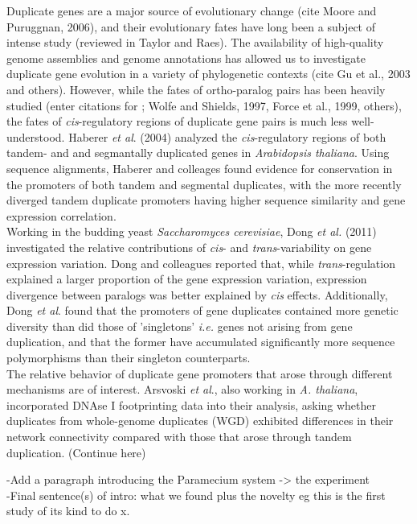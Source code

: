 \documentclass[nogrid]{MBE}%
\begin{document}
Duplicate genes are a major source of evolutionary change (cite \citep{Ohno:1970wm} Moore and Puruggnan, 2006), and their evolutionary fates have long been a subject of intense study (reviewed in Taylor and Raes). The availability of high-quality genome assemblies and genome annotations has allowed us to investigate duplicate gene evolution in a variety of phylogenetic contexts (cite Gu et al., 2003 and others). However, while the fates of ortho-paralog pairs has been heavily studied (enter citations for \citep{Ohno:1970wm}; Wolfe and Shields, 1997, Force et al., 1999, others), the fates of \textit{cis}-regulatory regions of duplicate gene pairs is much less well-understood. Haberer \textit{et al}. (2004) analyzed the \textit{cis}-regulatory regions of both tandem- and and segmantally duplicated genes in \textit{Arabidopsis thaliana}. Using sequence alignments, Haberer and colleages found evidence for conservation in the promoters of both tandem and segmental duplicates, with the more recently diverged tandem duplicate promoters having higher sequence similarity and gene expression correlation.\\

Working in the budding yeast \textit{Saccharomyces cerevisiae}, Dong \textit{et al.} (2011) investigated the relative contributions of \textit{cis}- and \textit{trans}-variability on gene expression variation. Dong and colleagues reported that, while \textit{trans}-regulation explained a larger proportion of the gene expression variation, expression divergence between paralogs was better explained by \textit{cis} effects. Additionally, Dong \textit{et al}. found that the promoters of gene duplicates contained more genetic diversity than did those of 'singletons' \textit{i.e.} genes not arising from gene duplication, and that the former have accumulated significantly more sequence polymorphisms than their singleton counterparts.\\

The relative behavior of duplicate gene promoters that arose through different mechanisms are of interest. Arsvoski \textit{et al}., also working in \textit{A. thaliana}, incorporated DNAse I footprinting data into their analysis, asking whether duplicates from whole-genome duplicates (WGD) exhibited differences in their network connectivity compared with those that arose through tandem duplication. (Continue here) 

-Add a paragraph introducing the Paramecium system -> the experiment\\
-Final sentence(s) of intro: what we found plus the novelty eg this is the first study of its kind to do x.
\end{document}
